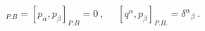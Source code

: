 \begin{equation}
[q^{\alpha},q^{\beta}]_{P.B}=[p_{\alpha},p_{\beta}]_{P.B}=0~,~~~~~~ 
[q^\alpha,p_{\beta}]_{P.B.}={\delta^{\alpha}}_\beta~.  \label{eq:buc}
\end{equation}

